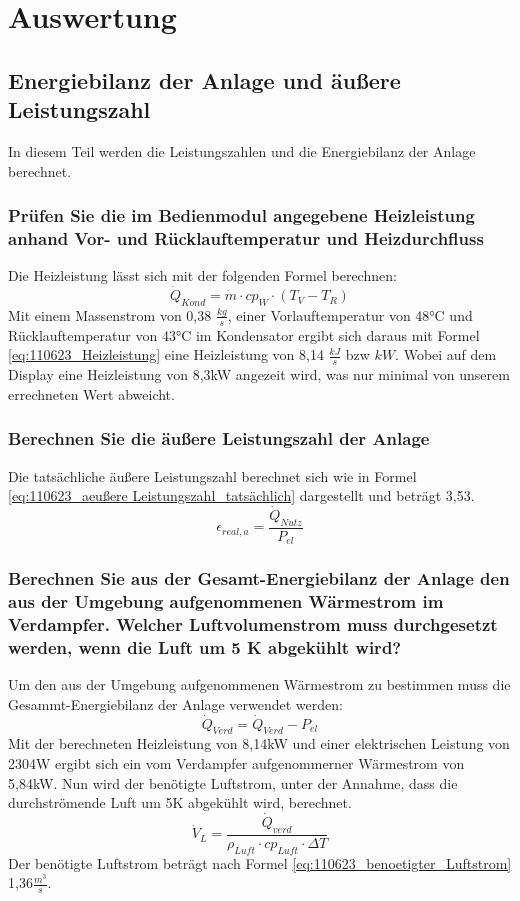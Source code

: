 \newpage
\section{Auswertung}
\label{sec:Auswertung}
\subsection{Energiebilanz der Anlage und äußere Leistungszahl}
In diesem Teil werden die Leistungszahlen und die Energiebilanz der Anlage berechnet.
\subsubsection{Prüfen Sie die im Bedienmodul angegebene Heizleistung anhand Vor- und Rücklauftemperatur und Heizdurchfluss}
Die Heizleistung lässt sich mit der folgenden Formel berechnen:
\begin{equation}
\dot Q_{Kond}= \dot m \cdot cp_{W} \cdot (T_{V} - T_{R})
\label{eq:110623_Heizleistung}
\end{equation}
Mit einem Massenstrom von 0,38 $\frac{kg}{s}$, einer Vorlauftemperatur von 48°C und Rücklauftemperatur von 43°C im Kondensator ergibt sich daraus mit Formel \ref{eq:110623_Heizleistung} eine Heizleistung von 8,14 $\frac{kJ}{s}$ bzw $kW$. Wobei auf dem Display eine Heizleistung von 8,3kW angezeit wird, was nur minimal von unserem errechneten Wert abweicht.
\subsubsection{Berechnen Sie die äußere Leistungszahl der Anlage}
Die tatsächliche äußere Leistungszahl berechnet sich wie in Formel \ref{eq:110623_aeußere Leistungszahl_tatsächlich} dargestellt und beträgt 3,53.
\begin{equation}
\epsilon_{real,a} = \frac{\dot Q_{Nutz}}{P_{el}}
\label{eq:110623_aeußere Leistungszahl_tatsächlich}
\end{equation}
\subsubsection{Berechnen Sie aus der Gesamt-Energiebilanz der Anlage den aus der Umgebung aufgenommenen Wärmestrom im Verdampfer.
Welcher Luftvolumenstrom muss durchgesetzt werden, wenn die Luft um 5 K abgekühlt wird?}
Um den aus der Umgebung aufgenommenen Wärmestrom zu bestimmen muss die Gesammt-Energiebilanz der Anlage verwendet werden:
\begin{equation}
\dot Q_{Verd}=\dot Q_{Verd}-P_{el}
\label{eq:110623_aeußere Leistungszahl}
\end{equation}
Mit der berechneten Heizleistung von 8,14kW und einer elektrischen Leistung von 2304W ergibt sich ein vom Verdampfer aufgenommerner Wärmestrom von 5,84kW. Nun wird der benötigte Luftstrom, unter der Annahme, dass die durchströmende Luft um 5K abgekühlt wird, berechnet.
\begin{equation}
\dot V_{L}=\frac{\dot Q_{verd}}{\rho_{Luft} \cdot cp_{Luft} \cdot \Delta T}
\label{eq:110623_benoetigter_Luftstrom}
\end{equation}
Der benötigte Luftstrom beträgt nach Formel \ref{eq:110623_benoetigter_Luftstrom} 1,36$\frac{m^3}{s}$. 
